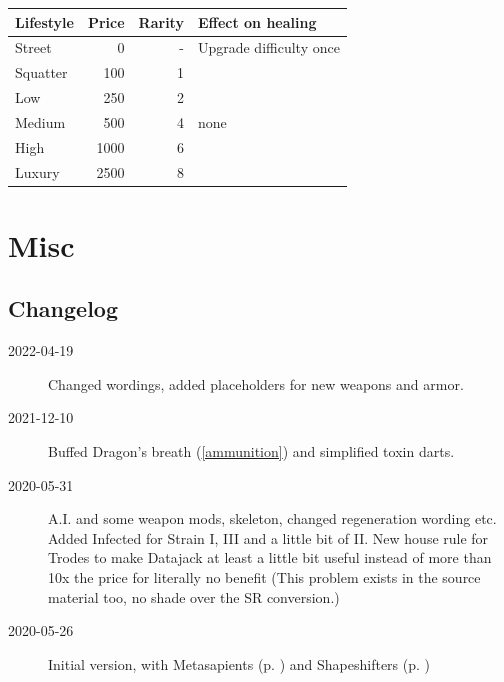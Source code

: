 \documentclass{book}
\begin{document}
\RowColors
\begin{tabular}{ l r r l }
	\rowcolor{tablegold}
	\color{white}\textbf{Lifestyle} & \color{white}\textbf{Price} & \color{white}\textbf{Rarity} & \color{white}\textbf{Effect on healing}\\
	\hline\textsl{}
	Street & 0 & - & Upgrade difficulty once\\		
	Squatter & 100 & 1 & \SetbackDie \SetbackDie \\				
	Low & 250 & 2 & \SetbackDie \\
	Medium & 500 & 4 & none \\
	High & 1000 & 6 & \BoostDie  \\
	Luxury & 2500 & 8 & \BoostDie \BoostDie \\		
\end{tabular}


\printindex

\appendix
\chapter{Misc}
\section{Changelog}
\begin{description}
	\item[2022-04-19] Changed wordings, added placeholders for new weapons and armor. 
	\item[2021-12-10] Buffed Dragon's breath (\ref{ammunition}) and simplified toxin darts.
	\item[2020-05-31] A.I. and some weapon mods, skeleton, changed regeneration wording etc. Added Infected \pageref{sec:gettinginfected} for Strain I, III and a little bit of II. New house rule for Trodes to make Datajack at least a little bit useful instead of more than 10x the price for literally no benefit (This problem exists in the source material too, no shade over the SR conversion.)
	\item[2020-05-26] Initial version, with Metasapients (p. \pageref{sec:metasapients}) and Shapeshifters (p. \pageref{sec:shapeshifters}) 
\end{description}
\end{document}
